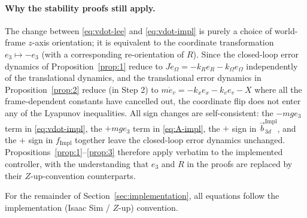 \documentclass[11pt]{article}
\theoremstyle{remark}
\begin{document}
\paragraph{Why the stability proofs still apply.} The change between \eqref{eq:vdot-lee} and \eqref{eq:vdot-impl} is purely a choice of world-frame $z$-axis orientation; it is equivalent to the coordinate transformation $e_3 \mapsto -e_3$ (with a corresponding re-orientation of $R$). Since the closed-loop error dynamics of Proposition~\ref{prop:1} reduce to $J\dot e_\Omega = -k_R e_R - k_\Omega e_\Omega$ independently of the translational dynamics, and the translational error dynamics in Proposition~\ref{prop:2} reduce (in Step 2) to $m\dot e_v = -k_x e_x - k_v e_v - X$ where all the frame-dependent constants have cancelled out, the coordinate flip does not enter any of the Lyapunov inequalities. All sign changes are self-consistent: the $-mg e_3$ term in \eqref{eq:vdot-impl}, the $+mg e_3$ term in \eqref{eq:A-impl}, the $+$ sign in $\vec{b}_{3d}^{\text{Impl}}$, and the $+$ sign in $f_{\text{Impl}}$ together leave the closed-loop error dynamics unchanged. Propositions~\ref{prop:1}--\ref{prop:3} therefore apply verbatim to the implemented controller, with the understanding that $e_3$ and $R$ in the proofs are replaced by their $Z$-up-convention counterparts.

For the remainder of Section~\ref{sec:implementation}, all equations follow the implementation (Isaac Sim / $Z$-up) convention.
\end{document}
